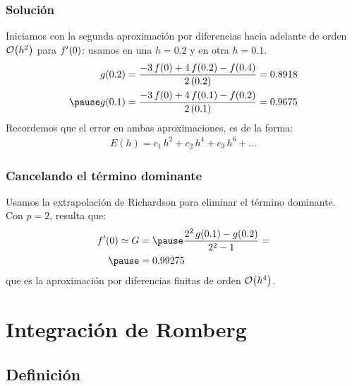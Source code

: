 \documentclass[12pt]{beamer}
\begin{document}
\begin{frame}
\frametitle{Solución}
Iniciamos con la segunda aproximación por diferencias hacia adelante de orden $\order{h^{2}}$ para ${f}^{\prime} (0)$: usamos en una $h = 0.2$ y en otra $h = 0.1$.
\pause
\begin{eqnarray*}
\begin{aligned}
g (0.2) &= \dfrac{-3 \, f (0) + 4 \, f (0.2) - f (0.4)}{2 \, (0.2)} = 0.8918 \\[0.em] \pause
g (0.1) &= \dfrac{-3 \, f (0) + 4 \, f (0.1) - f (0.2)}{2 \, (0.1)} = 0.9675
\end{aligned}
\end{eqnarray*}
\pause
Recordemos que el error en ambas aproximaciones, es de la forma:
\pause
\begin{align*}
E (h) = c_{1} \, h^{2} + c_{2} \, h^{4} + c_{3} \, h^{6} + \ldots
\end{align*}
\end{frame}
\begin{frame}
\frametitle{Cancelando el término dominante}
Usamos la extrapolación de Richardson para eliminar el término dominante.
\\
\bigskip
\pause
Con $p = 2$, resulta que:
\pause
\begin{eqnarray*}
\begin{aligned}
\pderivada{f} (0) \simeq G &= \pause  \dfrac{2^{2} \, g (0.1) - g (0.2)}{2^{2} - 1} = \\ \pause
&= 0.99275
\end{aligned}
\end{eqnarray*}
que es la aproximación por diferencias finitas de orden $\order{h^{4}}$.
\end{frame}

\section{Integración de Romberg}
\subsection{Definición}
\end{document}
